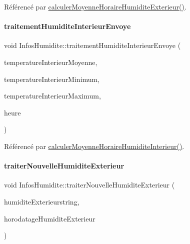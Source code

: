 Référencé par \hyperlink{class_infos_humidite_afc4f6ba3cd4664118ef40f4c12b76506}{calculer\+Moyenne\+Horaire\+Humidite\+Exterieur()}.

\mbox{\label{class_infos_humidite_a3643afa07ff3ac73a4190d77ce230d3b}} 
\paragraph{\texorpdfstring{traitement\+Humidite\+Interieur\+Envoye}{traitementHumiditeInterieurEnvoye}}
{\footnotesize\ttfamily void Infos\+Humidite\+::traitement\+Humidite\+Interieur\+Envoye (\begin{DoxyParamCaption}\item[{const double}]{temperature\+Interieur\+Moyenne,  }\item[{const double}]{temperature\+Interieur\+Minimum,  }\item[{const double}]{temperature\+Interieur\+Maximum,  }\item[{int}]{heure }\end{DoxyParamCaption})\hspace{0.3cm}{\ttfamily [signal]}}



Référencé par \hyperlink{class_infos_humidite_acd903311f6c949f8f010b330f517e4f3}{calculer\+Moyenne\+Horaire\+Humidite\+Interieur()}.

\mbox{\label{class_infos_humidite_a8d17fa3c7d15b1ff8130ae5d22702e5f}} 
\paragraph{\texorpdfstring{traiter\+Nouvelle\+Humidite\+Exterieur}{traiterNouvelleHumiditeExterieur}}
{\footnotesize\ttfamily void Infos\+Humidite\+::traiter\+Nouvelle\+Humidite\+Exterieur (\begin{DoxyParamCaption}\item[{Q\+String}]{humidite\+Exterieurstring,  }\item[{Q\+String}]{horodatage\+Humidite\+Exterieur }\end{DoxyParamCaption})\hspace{0.3cm}{\ttfamily [slot]}}


